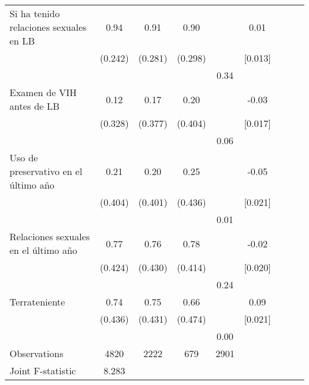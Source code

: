 \begin{table}[htbp]
\begin{tabular}{l*{4}{cc}}
\hspace{0.2cm}Si ha tenido relaciones sexuales en LB&     0.94&     0.91&     0.90&         &     0.01         \\
                &  (0.242)&  (0.281)&  (0.298)&         &  [0.013]         \\
                &         &         &         &     0.34&                  \\
\hspace{0.2cm}Examen de VIH antes de LB&     0.12&     0.17&     0.20&         &    -0.03         \\
                &  (0.328)&  (0.377)&  (0.404)&         &  [0.017]         \\
                &         &         &         &     0.06&                  \\
\hspace{0.2cm}Uso de preservativo en el último año&     0.21&     0.20&     0.25&         &    -0.05\sym{*}  \\
                &  (0.404)&  (0.401)&  (0.436)&         &  [0.021]         \\
                &         &         &         &     0.01&                  \\
\hspace{0.2cm}Relaciones sexuales en el último año&     0.77&     0.76&     0.78&         &    -0.02         \\
                &  (0.424)&  (0.430)&  (0.414)&         &  [0.020]         \\
                &         &         &         &     0.24&                  \\
\hspace{0.2cm}Terrateniente&     0.74&     0.75&     0.66&         &     0.09\sym{***}\\
                &  (0.436)&  (0.431)&  (0.474)&         &  [0.021]         \\
                &         &         &         &     0.00&                  \\
\hline
Observations    &     4820&     2222&      679&     2901&                  \\
Joint F-statistic&    8.283         &         &         &         &                  \\
\hline\hline
\end{tabular}
\end{table}
